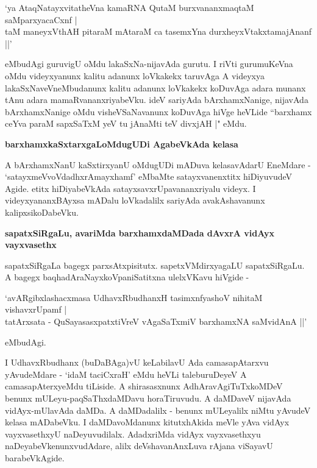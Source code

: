 \begin{shloka}
`ya AtaqNatayxvitatheVna kamaRNA QutaM burxvananxmaqtaM saMparxyacaCxnf |\\\label{91}
taM maneyxVthAH pitaraM mAtaraM ca tasemxYna durxheyxVtakxtamajAnanf ||'
\end{shloka}

\noindent
eMbudAgi guruvigU oMdu lakaSxNa-nijavAda gurutu. I riVti gurumuKeVna oMdu videyx\-yanunx kalitu adanunx loVkakekx taruvAga A videyxya lakaSxNa\-veVneMbudanunx kalitu adanunx loVkakekx koDu\-vAga adara munanx tAnu adara mamaRvananxriyabeVku. ideV sariyAda bArxhamxNanige, nijavAda bArxhamxNanige oMdu visheVSaNavanunx koDuvAga hiVge heVLide ``barxhamx ceYva paraM sapxSaTxM\label{92} yeV tu jAnaMti teV divxjAH |" eMdu.

{\bigskip
\noindent
{\large\bf barxhamxkaSxtarxgaLoMdugUDi AgabeVkAda kelasa}}\label{page92}
\medskip

\noindent
A bArxhamxNanU kaSxtirxyanU oMdugUDi mADuva kelasavAdarU EneMdare - `satayxmeVvoVdadhxrAmayx\-hamf'\label{92} eMbaMte satayxvanenxtitx hiDiyuvudeV Agide. etitx hiDiyabeVkAda satayxsavxrUpavananxriyalu videyx. I videyxyananxBAyxsa mADalu loVkadalilx sariyAda avakAshavanunx kalipxsikoDabeVku.

{\bigskip
\noindent
{\large\bf sapatxSiRgaLu, avariMda barxhamxdaMDada dAvxrA vidAyx vayxvasethx}}\label{page92}
\medskip

\noindent
sapatxSiRgaLa bagegx parxsAtxpisitutx. sapetxVMdirxyagaLU sapatxSiRgaLu. A bagegx baqhadAraNayxkoVpaniSatitxna ulelxV\-Kavu hiVgide - 

\begin{shloka}
`avARgibxlashacxmasa UdhavxRbudhanxH tasimxnfyashoV nihitaM vishavxrUpamf |\\\label{92}
tatArxsata - QuSayasasxpatxtiVreV vAgaSaTxmiV barxhamxNA saMvidAnA ||'
\end{shloka}

\noindent
eMbudAgi.

I UdhavxRbudhanx (buDaBAga)vU keLabilavU Ada camasapAtarxvu yAvu\-deMdare - `idaM taciCxraH'\- eMdu heVLi taleburuDeyeV A camasapAterxyeMdu tiLiside. A shirasasxnunx AdhAravAgiTuTxkoMDeV benunx\- mULeyu-paqSaThxdaMDavu hora\-Tiruvudu. A daMDaveV nijavAda vidAyx-mUlavAda daMDa. A daMDadalilx - benunx mULeyalilx niMtu yAvudeV kelasa mADabeVku. I daMDavoMdanunx kitutxhAkida meVle yAva vidAyx vayxvasethxyU naDeyuvudilalx. AdadxriMda vidAyx vayxvasethxyu naDeyabeVkenunxvudAdare, alilx deVshavanAnxLuva rAjana viSayavU barabeVkAgide.

